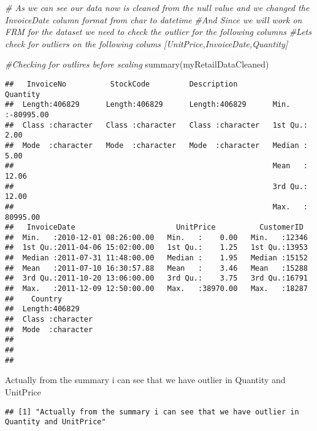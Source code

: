 \documentclass[
]{article}
\newenvironment{Shaded}{\begin{snugshade}}{\end{snugshade}}
\newcommand{\CommentTok}[1]{\textcolor[rgb]{0.56,0.35,0.01}{\textit{#1}}}
\newcommand{\FunctionTok}[1]{\textcolor[rgb]{0.00,0.00,0.00}{#1}}
\newcommand{\NormalTok}[1]{#1}
\newcommand{\StringTok}[1]{\textcolor[rgb]{0.31,0.60,0.02}{#1}}
\begin{document}
\begin{Shaded}
\begin{Highlighting}[]
\CommentTok{\# As we can see our data now is cleaned from the null value and we changed the InvoiceDate column format from char to datetime}
\CommentTok{\#And Since we will work on FRM for the dataset we need to check the outlier for the following columns}
\CommentTok{\#Let\textquotesingle{}s check for outliers on the following colums [UnitPrice,InvoiceDate,Quantity]}


\CommentTok{\#Checking for outlires before scaling}
\FunctionTok{summary}\NormalTok{(myRetailDataCleaned)}
\end{Highlighting}
\end{Shaded}

\begin{verbatim}
##   InvoiceNo          StockCode         Description           Quantity        
##  Length:406829      Length:406829      Length:406829      Min.   :-80995.00  
##  Class :character   Class :character   Class :character   1st Qu.:     2.00  
##  Mode  :character   Mode  :character   Mode  :character   Median :     5.00  
##                                                           Mean   :    12.06  
##                                                           3rd Qu.:    12.00  
##                                                           Max.   : 80995.00  
##   InvoiceDate                       UnitPrice          CustomerID   
##  Min.   :2010-12-01 08:26:00.00   Min.   :    0.00   Min.   :12346  
##  1st Qu.:2011-04-06 15:02:00.00   1st Qu.:    1.25   1st Qu.:13953  
##  Median :2011-07-31 11:48:00.00   Median :    1.95   Median :15152  
##  Mean   :2011-07-10 16:30:57.88   Mean   :    3.46   Mean   :15288  
##  3rd Qu.:2011-10-20 13:06:00.00   3rd Qu.:    3.75   3rd Qu.:16791  
##  Max.   :2011-12-09 12:50:00.00   Max.   :38970.00   Max.   :18287  
##    Country         
##  Length:406829     
##  Class :character  
##  Mode  :character  
##                    
##                    
## 
\end{verbatim}

\begin{Shaded}
\begin{Highlighting}[]
\StringTok{\textquotesingle{}Actually from the summary i can see that we have outlier in Quantity and UnitPrice\textquotesingle{}}
\end{Highlighting}
\end{Shaded}

\begin{verbatim}
## [1] "Actually from the summary i can see that we have outlier in Quantity and UnitPrice"
\end{verbatim}
\end{document}
